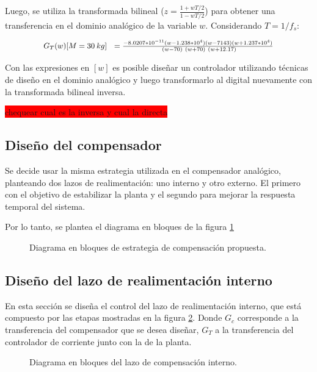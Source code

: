 Luego, se utiliza la transformada bilineal ($z=\frac{1+wT/2}{1-wT/2}$) para obtener una transferencia en el dominio analógico de la variable $w$. Considerando $T=1/f_s$:

\begin{equation}
	\resizebox{.8\hsize}{!}
	{
		$G_T(w)[M=30\:kg]\ \ =\frac{-8.0207*10^{-11}(w-1.238*10^4)(w-7143)(w+1.237*10^4)}{\ (w-70)\ (w+70)\ (w+12.17)}$
	}
\end{equation}


 Con las expresiones en $[w]$ es posible diseñar un controlador utilizando técnicas de diseño en el dominio analógico y luego transformarlo al digital nuevamente con la transformada bilineal inversa.
 
 \colorbox{red}{chequear cual es la inversa y cual la directa}

\subsection{Diseño del compensador}

Se decide usar la misma estrategia utilizada en el compensador analógico, planteando dos lazos de realimentación: uno interno y otro externo. El primero con el objetivo de estabilizar la planta y el segundo para mejorar la respuesta temporal del sistema.  

Por lo tanto, se plantea el diagrama en bloques de la figura \ref{fig:diag-en-bloques-comp_digital}

\begin{figure}[H]
	\centering
	\scalebox{0.8}{}
	\caption{Diagrama en bloques de estrategia de compensación propuesta.}	\label{fig:diag-en-bloques-comp_digital}
\end{figure}

\subsection{Diseño del lazo de realimentación interno}

En esta sección se diseña el control del lazo de realimentación interno, que está compuesto por las etapas mostradas en la figura \ref{fig:diag-interno_dig}. Donde $G_c$ corresponde a la transferencia del compensador que se desea diseñar, $G_{T}$ a la transferencia del controlador de corriente junto con la de la planta.

\begin{figure}[H]
	\centering
	
	\caption{Diagrama en bloques del lazo de compensación interno.}	\label{fig:diag-interno_dig}
\end{figure}

